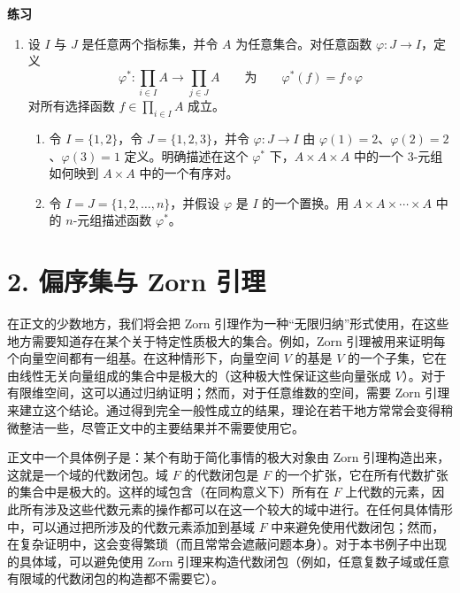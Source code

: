 \begin{center}
\textbf{练习}
\end{center}

\begin{enumerate}[label=\arabic*.]
  \item 设 $I$ 与 $J$ 是任意两个指标集，并令 $A$ 为任意集合。对任意函数 $\varphi:J\to I$，定义
  \[
    \varphi^*:\prod_{i\in I}A\longrightarrow\prod_{j\in J}A
    \qquad\text{为}\qquad
    \varphi^*(f)=f\circ\varphi
  \]
  对所有选择函数 $f\in\prod_{i\in I}A$ 成立。
  \begin{enumerate}[label=(\alph*)]
    \item 令 $I=\{1,2\}$，令 $J=\{1,2,3\}$，并令 $\varphi:J\to I$ 由 $\varphi(1)=2$、$\varphi(2)=2$、$\varphi(3)=1$ 定义。明确描述在这个 $\varphi^*$ 下，$A\times A\times A$ 中的一个 3-元组如何映到 $A\times A$ 中的一个有序对。
    \item 令 $I=J=\{1,2,\ldots,n\}$，并假设 $\varphi$ 是 $I$ 的一个置换。用 $A\times A\times\cdots\times A$ 中的 $n$-元组描述函数 $\varphi^*$。
  \end{enumerate}
\end{enumerate}

\section*{2. 偏序集与 Zorn 引理}

在正文的少数地方，我们将会把 Zorn 引理作为一种“无限归纳”形式使用，在这些地方需要知道存在某个关于特定性质极大的集合。例如，Zorn 引理被用来证明每个向量空间都有一组基。在这种情形下，向量空间 $V$ 的基是 $V$ 的一个子集，它在由线性无关向量组成的集合中是极大的（这种极大性保证这些向量张成 $V$）。对于有限维空间，这可以通过归纳证明；然而，对于任意维数的空间，需要 Zorn 引理来建立这个结论。通过得到完全一般性成立的结果，理论在若干地方常常会变得稍微整洁一些，尽管正文中的主要结果并不需要使用它。

正文中一个具体例子是：某个有助于简化事情的极大对象由 Zorn 引理构造出来，这就是一个域的代数闭包。域 $F$ 的代数闭包是 $F$ 的一个扩张，它在所有代数扩张的集合中是极大的。这样的域包含（在同构意义下）所有在 $F$ 上代数的元素，因此所有涉及这些代数元素的操作都可以在这一个较大的域中进行。在任何具体情形中，可以通过把所涉及的代数元素添加到基域 $F$ 中来避免使用代数闭包；然而，在复杂证明中，这会变得繁琐（而且常常会遮蔽问题本身）。对于本书例子中出现的具体域，可以避免使用 Zorn 引理来构造代数闭包（例如，任意复数子域或任意有限域的代数闭包的构造都不需要它）。

